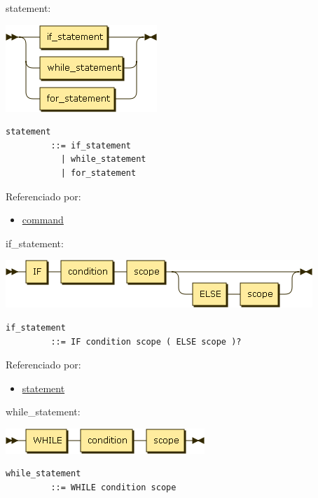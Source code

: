 \protect\hypertarget{statement}{}{statement:}

\includegraphics[width=2.25000in,height=1.29167in]{diagram/statement.png}

\begin{verbatim}
statement
         ::= if_statement
           | while_statement
           | for_statement
\end{verbatim}

Referenciado por:

\begin{itemize}
\tightlist
\item
  \protect\hyperlink{command}{command}
\end{itemize}

\protect\hypertarget{if_statement}{}{if\_statement:}

\includegraphics[width=4.56250in,height=0.70833in]{diagram/if_statement.png}

\begin{verbatim}
if_statement
         ::= IF condition scope ( ELSE scope )?
\end{verbatim}

Referenciado por:

\begin{itemize}
\tightlist
\item
  \protect\hyperlink{statement}{statement}
\end{itemize}

\protect\hypertarget{while_statement}{}{while\_statement:}

\includegraphics[width=2.95833in,height=0.37500in]{diagram/while_statement.png}

\begin{verbatim}
while_statement
         ::= WHILE condition scope
\end{verbatim}


